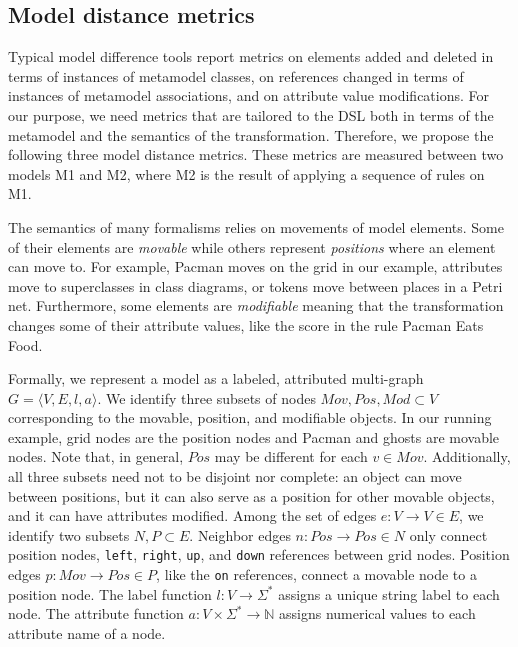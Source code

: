 \subsection{Model distance metrics}

Typical model difference tools report metrics on elements added and deleted in terms of instances of metamodel classes, on references changed in terms of instances of metamodel associations, and on attribute value modifications.
For our purpose, we need metrics that are tailored to the DSL both in terms of the metamodel and the semantics of the transformation.
Therefore, we propose the following three model distance metrics.
These metrics are measured between two models M1 and M2, where M2 is the result of applying a sequence of rules on M1.

The semantics of many formalisms relies on movements of model elements.
Some of their elements are \emph{movable} while others represent \emph{positions} where an element can move to.
For example, Pacman moves on the grid in our example, attributes move to superclasses in class diagrams, or tokens move between places in a Petri net.
Furthermore, some elements are \emph{modifiable} meaning that the transformation changes some of their attribute values, like the score in the rule Pacman Eats Food.

Formally, we represent a model as a labeled, attributed multi-graph $G=\langle V,E,l,a \rangle$.
We identify three subsets of nodes $Mov,Pos,Mod \subset V$ corresponding to the movable, position, and modifiable objects.
In our running example, grid nodes are the position nodes and Pacman and ghosts are movable nodes.
Note that, in general, $Pos$ may be different for each $v \in Mov$.
Additionally, all three subsets need not to be disjoint nor complete: an object can move between positions, but it can also serve as a position for other movable objects, and it can have attributes modified.
Among the set of edges $e:V \rightarrow V \in E$, we identify two subsets $N,P \subset E$.
Neighbor edges $n: Pos \rightarrow Pos \in N$ only connect position nodes, \eg \texttt{left}, \texttt{right}, \texttt{up}, and \texttt{down} references between grid nodes.
Position edges $p: Mov \rightarrow Pos \in P$, like the \texttt{on} references, connect a movable node to a position node.
The label function $l:V \rightarrow \Sigma^*$ assigns a unique string label to each node.
The attribute function $a:V \times \Sigma^* \rightarrow \mathbb{N}$ assigns numerical values to each attribute name of a node.

